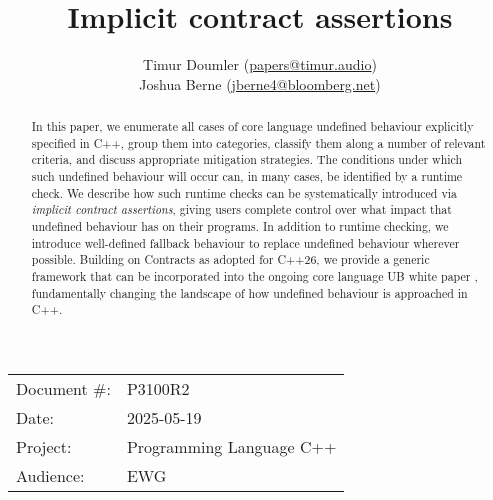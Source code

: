 

\title{Implicit contract assertions}
\author{ Timur Doumler \small(\href{mailto:papers@timur.audio}{papers@timur.audio}) 
\\ Joshua Berne \small(\href{mailto:jberne4@bloomberg.net}{jberne4@bloomberg.net})  
}
\date{}
\maketitle

\begin{tabular}{ll}
Document \#: & P3100R2 \\
Date: &2025-05-19 \\
Project: & Programming Language C++ \\
Audience: & EWG
\end{tabular}

\begin{abstract}
In this paper, we enumerate all cases of core language undefined behaviour explicitly specified in C++,  group them into categories, classify them along a number of relevant criteria, and discuss appropriate mitigation strategies. The conditions under which such undefined behaviour will occur can, in many cases, be identified by a runtime check. We describe how such runtime checks can be systematically introduced via \emph{implicit contract assertions}, giving users complete control over what impact that undefined behaviour has on their programs. In addition to runtime checking, we introduce well-defined fallback behaviour to replace undefined behaviour wherever possible. Building on Contracts as adopted for C++26, we provide a generic framework that can be incorporated into the ongoing core language UB white paper \cite{P3656R1}, fundamentally changing the landscape of how undefined behaviour is approached in C++.
\end{abstract}


\tableofcontents*
\pagebreak





